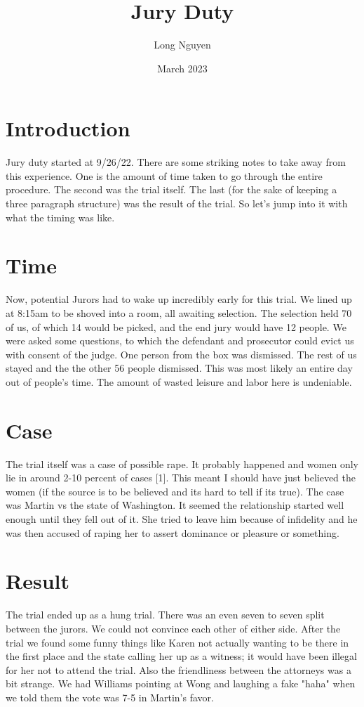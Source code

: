 \documentclass{article}
\title{Jury Duty}
\author{Long Nguyen}
\date{March 2023}
\begin{document}
\maketitle

\section{Introduction}
Jury duty started at 9/26/22. There are some striking notes to take away from this experience. One is the amount of time taken to go through the entire procedure. The second was the trial itself. The last (for the sake of keeping a three paragraph structure) was the result of the trial. So let's jump into it with what the timing was like.

\section{Time}
Now, potential Jurors had to wake up incredibly early for this trial. We lined up at 8:15am to be shoved into a room, all awaiting selection. The selection held 70 of us, of which 14 would be picked, and the end jury would have 12 people. We were asked some questions, to which the defendant and prosecutor could evict us with consent of the judge. One person from the box was dismissed. The rest of us stayed and the the other 56 people dismissed. This was most likely an entire day out of people's time. The amount of wasted leisure and labor here is undeniable.

\section{Case}
The trial itself was a case of possible rape. It probably happened and women only lie in around 2-10 percent of cases [1]. This meant I should have just believed the women (if the source is to be believed and its hard to tell if its true). The case was Martin vs the state of Washington. It seemed the relationship started well enough until they fell out of it. She tried to leave him because of infidelity and he was then accused of raping her to assert dominance or pleasure or something. 

\section{Result}
The trial ended up as a hung trial. There was an even seven to seven split between the jurors. We could not convince each other of either side. After the trial we found some funny things like Karen not actually wanting to be there in the first place and the state calling her up as a witness; it would have been illegal for her not to attend the trial. Also the friendliness between the attorneys was a bit strange. We had Williams pointing at Wong and laughing a fake "haha" when we told them the vote was 7-5 in Martin's favor.
\end{document}
